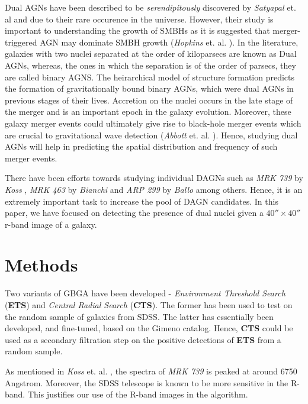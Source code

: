 \documentclass[12pt]{article}
\begin{document}
\bigskip

Dual AGNs have been described to be \textit{serendipitously} discovered by \textit{Satyapal} et. al \cite{satyapal} and \cite{jinny} due to their rare occurence in the universe. However, their study is important to understanding the growth of SMBHs as it is suggested that merger-triggered AGN may dominate SMBH growth (\textit{Hopkins} et. al. \cite{hopkins}). In the literature, galaxies with two nuclei separated at the order of kiloparsecs are known as Dual AGNs, whereas, the ones in which the separation is of the order of parsecs, they are called binary AGNS. The heirarchical model of structure formation predicts the formation of gravitationally bound binary AGNs, which were dual AGNs in previous stages of their lives. Accretion on the nuclei occurs in the late stage of the merger and is an important epoch in the galaxy evolution. Moreover, these galaxy merger events could ultimately give rise to black-hole merger events which are crucial to gravitational wave detection (\textit{Abbott} et. al. \cite{ligo}). Hence, studying dual AGNs will help in predicting the spatial distribution and frequency of such merger events.

\bigskip

There have been efforts towards studying individual DAGNs such as \textit{MRK 739} by \textit{Koss} \cite{koss_mrk739}, \textit{MRK 463} by \textit{Bianchi} \cite{bianchi} and \textit{ARP 299} by \textit{Ballo} \cite{ballo} among others. Hence, it is an extremely important task to increase the pool of DAGN candidates. In this paper, we have focused on detecting the presence of dual nuclei given a $40'' \times 40''$ r-band image of a galaxy.

\section{Methods}

Two variants of GBGA have been developed - \textit{Environment Threshold Search} (\textbf{ETS}) and \textit{Central Radial Search} (\textbf{CTS}). The former has been used to test on the random sample of galaxies from SDSS. The latter has essentially been developed, and fine-tuned, based on the Gimeno \cite{gimeno} catalog. Hence, \textbf{CTS} could be used as a secondary filtration step on the positive detections of \textbf{ETS} from a random sample.


\bigskip

As mentioned in \textit{Koss} et. al. \cite{koss_mrk739}, the spectra of \textit{MRK 739} is peaked at around 6750 Angstrom. Moreover, the SDSS telescope is known to be more sensitive in the R-band. This justifies our use of the R-band images in the algorithm.
\end{document}
